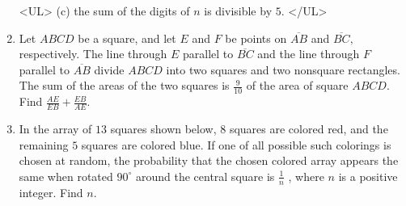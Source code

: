 \documentclass{article}
\begin{document}
\begin{enumerate}[label=\arabic*., itemsep=0.5em]
<UL>
(c) the sum of the digits of $n$ is divisible by $5.$
</UL>\par \vspace{0.5em}\item Let $ABCD$ be a square, and let $E$ and $F$ be points on $\overline{AB}$ and $\overline{BC},$ respectively. The line through $E$ parallel to $\overline{BC}$ and the line through $F$ parallel to $\overline{AB}$ divide $ABCD$ into two squares and two nonsquare rectangles. The sum of the areas of the two squares is $\frac{9}{10}$ of the area of square $ABCD.$ Find $\frac{AE}{EB} + \frac{EB}{AE}.$\par \vspace{0.5em}\item In the array of $13$ squares shown below, $8$ squares are colored red, and the remaining $5$ squares are colored blue. If one of all possible such colorings is chosen at random, the probability that the chosen colored array appears the same when rotated $90^{\circ}$ around the central square is $\frac{1}{n}$ , where $n$ is a positive integer. Find $n$.



\end{enumerate}
\end{document}
